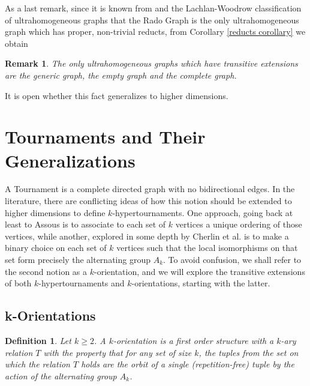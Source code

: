 \documentclass{amsart}
\newtheorem{remark}[theorem]{Remark}
\newtheorem{definition}[theorem]{Definition}
\begin{document}
As a last remark, since it is known from \cite{thomas1991reducts} and the Lachlan-Woodrow classification of ultrahomogeneous graphs \cite{lachlan1980countable} that the Rado Graph is the only ultrahomogeneous graph which has proper, non-trivial reducts, from Corollary \ref{reducts corollary} we obtain
\begin{remark}
    The only ultrahomogeneous graphs which have transitive extensions are the generic graph, the empty graph and the complete graph.
\end{remark}

It is open whether this fact generalizes to higher dimensions.



\section{Tournaments and Their Generalizations}\label{tournaments}

A Tournament is a complete directed graph with no bidirectional edges. In the literature, there are conflicting ideas of how this notion should be extended to higher dimensions to define $k$-hypertournaments. One approach, going back at least to Assous \cite{assous1986enchainabilite} is to associate to each set of $k$ vertices a unique ordering of those vertices, while another, explored in some depth by Cherlin et al. \cite{cherlin2021ramsey} is to make a binary choice on each set of $k$ vertices such that the local isomorphisms on that set form precisely the alternating group $A_k$. To avoid confusion, we shall refer to the second notion as a $k$-orientation, and we will explore the transitive extensions of both $k$-hypertournaments and $k$-orientations, starting with the latter.

\subsection{k-Orientations}

\begin{definition}
    Let $k \geq 2$. A \emph{$k$-orientation} is a first order structure with a $k$-ary relation $T$ with the property that for any set of size $k$, the tuples from the set on which the relation $T$ holds are the orbit of a single (repetition-free) tuple by the action of the alternating group $A_k$.
\end{definition}
\end{document}
